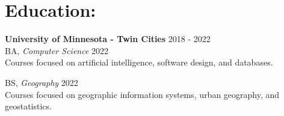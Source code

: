 \documentclass[10pt]{article}
\begin{document}
		
		
	\section*{Education: \hrulefill} 
		\textbf{University of Minnesota - Twin Cities} \hfill 2018 - 2022 \\
		\indent BA, \textit{Computer Science} \hfill 2022 \\
		\indent \indent Courses focused on artificial intelligence, software design, and databases. 
		
		\indent BS, \textit{Geography} \hfill 2022 \\
		\indent \indent Courses focused on geographic information systems, urban geography, and geostatistics.		
		
\end{document}
